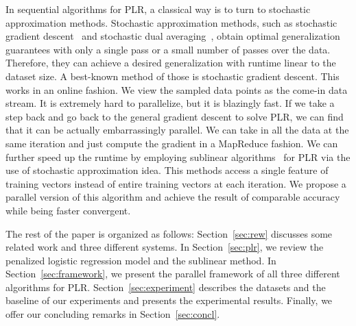 \documentclass{llncs}
\begin{document}
In sequential algorithms for PLR, a classical way is to turn to stochastic approximation methods.
Stochastic approximation methods, such as stochastic gradient descent~\cite{zhang2004solving} and stochastic dual averaging~\cite{xiao2010dual}, obtain optimal generalization guarantees with only a single pass or a small number of passes over the data.
Therefore, they can achieve a desired generalization with runtime linear to the dataset size.
A best-known method of those is stochastic gradient descent. This works in an online fashion. We view the sampled data points as the come-in data stream. It is extremely hard to parallelize, but it is blazingly fast.
If we take a step back and go back to the general gradient descent to solve PLR, we can find that it can be actually embarrassingly parallel. We can take in all the data at the same iteration and just compute the gradient in a MapReduce fashion.
We can further speed up the runtime by employing sublinear algorithms~\cite{peng2012sublinear} for PLR via the use of stochastic approximation idea.
This methods access a single feature of training vectors instead of entire training vectors at each iteration.
We propose a parallel version of this algorithm and achieve the result of comparable accuracy while being faster convergent.
	
The rest of the paper is organized as follows:
Section~\ref{sec:rew} discusses some related work and three different systems.
In Section~\ref{sec:plr}, we review the penalized logistic regression model and the sublinear method.
In Section~\ref{sec:framework}, we present the parallel framework of all three different algorithms for PLR.
Section~\ref{sec:experiment} describes the datasets and the baseline of our experiments and presents the experimental results.
Finally, we offer our concluding remarks in Section~\ref{sec:concl}.
\end{document}
